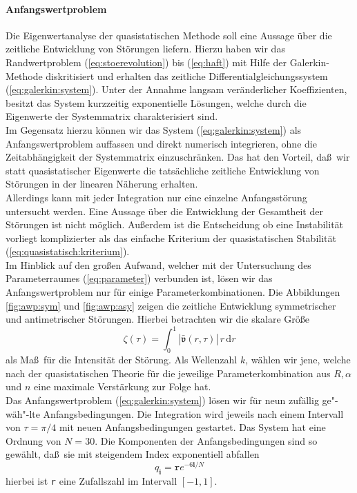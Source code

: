 \documentclass[10pt,a5paper,oneside,draft]{book}
\numberwithin{equation}{chapter}
\begin{document}
\paragraph{Anfangswertproblem}
Die Eigenwertanalyse der quasistatischen Methode soll eine Aussage \"uber die zeitliche Entwicklung von St\"orungen liefern.
Hierzu haben wir das Randwertproblem (\mbox{\ref{eq:stoerevolution}}) bis (\mbox{\ref{eq:haft}}) mit Hilfe der Galerkin-Methode diskritisiert und erhalten das zeitliche Differentialgleichungssystem (\mbox{\ref{eq:galerkin:system}}).
Unter der Annahme langsam ver\"anderlicher Koeffizienten, besitzt das System kurzzeitig exponentielle L\"osungen, welche durch die Eigenwerte der Systemmatrix charakterisiert sind.\\
Im Gegensatz hierzu k\"onnen wir das System (\mbox{\ref{eq:galerkin:system}}) als Anfangswertproblem auffassen und direkt numerisch integrieren, ohne die Zeitabh\"angigkeit der Systemmatrix einzuschr\"anken.
Das hat den Vorteil, da\ss\ wir statt quasistatischer Eigenwerte die tats\"achliche zeitliche Entwicklung von St\"orungen in der linearen N\"aherung erhalten.\\
Allerdings kann mit jeder Integration nur eine einzelne Anfangsst\"orung untersucht werden.
Eine Aussage \"uber die Entwicklung der Gesamtheit der St\"orungen ist nicht m\"oglich.
Au\ss erdem ist die Entscheidung ob eine Instabilit\"at vorliegt komplizierter als das einfache Kriterium der quasistatischen Stabilit\"at (\mbox{\ref{eq:quasistatisch:kriterium}}).\\
Im Hinblick auf den gro\ss en Aufwand, welcher mit der Untersuchung des Parameterraumes (\mbox{\ref{eq:parameter}}) verbunden ist, l\"osen wir das Anfangswertproblem nur f\"ur einige Parameterkombinationen.
Die Abbildungen \ref{fig:awp:sym} und \ref{fig:awp:asy} zeigen die zeitliche Entwicklung symmetrischer und antimetrischer St\"orungen.
Hierbei betrachten wir die skalare Gr\"o\ss e
\begin{equation}
	\zeta(\tau) = \int_0^1 |\bar{\mathfrak{v}}(r,\tau)|\, r\,\textrm{d}r
\end{equation}
als Ma\ss\ f\"ur die Intensit\"at der St\"orung.
Als Wellenzahl $k$, w\"ahlen wir jene, welche nach der quasistatischen Theorie f\"ur die jeweilige Parameterkombination aus $R,\alpha$ und $n$ eine maximale Verst\"arkung zur Folge hat.\\
Das Anfangswertproblem (\mbox{\ref{eq:galerkin:system}}) l\"osen wir f\"ur neun zuf\"allig ge"-w\"ah"-lte Anfangsbedingungen.
Die Integration wird jeweils nach einem Intervall von $\tau=\pi/4$ mit neuen Anfangsbedingungen gestartet.
Das System hat eine Ordnung von $N=30$.
Die Komponenten der Anfangsbedingungen sind so gew\"ahlt, da\ss\ sie mit steigendem Index exponentiell abfallen
\begin{equation}
	q_\mathbf{i} = \mathtt{r}e^{-6\mathbf{i}/N}
\end{equation}
hierbei ist \texttt{r} eine Zufallszahl im Intervall $[-1,1]$.\\
\end{document}
